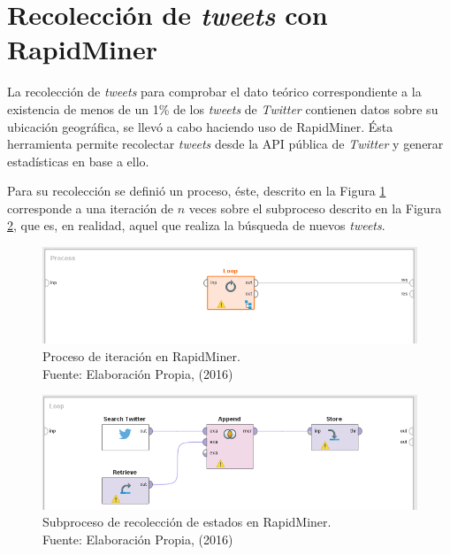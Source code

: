 
\section{Recolección de \textit{tweets} con RapidMiner}
\label{apendice:apendice1}

La recolección de \textit{tweets} para comprobar el dato teórico correspondiente a la existencia de menos de un 1\% de los \textit{tweets} de \textit{Twitter} contienen datos sobre su ubicación geográfica, se llevó a cabo haciendo uso de RapidMiner. Ésta herramienta permite recolectar \textit{tweets} desde la API pública de \textit{Twitter} y generar estadísticas en base a ello.

Para su recolección se definió un proceso, éste, descrito en la Figura \ref{fig:RMP} corresponde a una iteración de $n$ veces sobre el subproceso descrito en la Figura \ref{fig:RMSP}, que es, en realidad, aquel que realiza la búsqueda de nuevos \textit{tweets}.

\begin{figure}[H]
        \centering
        \captionsetup{justification=centering}
        \includegraphics[scale=0.8]{images/RMProcess.png}
        \caption[Proceso de iteración en RapidMiner.]{Proceso de iteración en RapidMiner.\\Fuente: Elaboración Propia, (2016)}
        \label{fig:RMP}
\end{figure}

\begin{figure}[H]
        \centering
        \captionsetup{justification=centering}
        \includegraphics[scale=0.8]{images/RMSProcess.png}
        \caption[Subproceso de recolección de estados en RapidMiner.]{Subproceso de recolección de estados en RapidMiner.\\Fuente: Elaboración Propia, (2016)}
        \label{fig:RMSP}
\end{figure}

